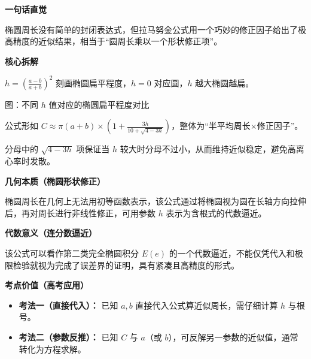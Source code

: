 \begin{explanationbox}
	\textbf{\textcolor{CExplanation}{一句话直觉}}

	椭圆周长没有简单的封闭表达式，但拉马努金公式用一个巧妙的修正因子给出了极高精度的近似结果，相当于“圆周长乘以一个形状修正项”。

	\medskip

	\textbf{\textcolor{CExplanation}{核心拆解}}

	\begin{description}[style=nextline, leftmargin=2.8em, labelsep=0.5em, itemsep=0.45em]
		\item[\textbf{要点一（h参数含义）：}]
		      $h=\left(\frac{a-b}{a+b}\right)^2$ 刻画椭圆扁平程度，$h=0$ 对应圆，$h$ 越大椭圆越扁。
		      \begin{center}
			      

			      \vspace{0.3em}
			      {\small 图：不同 $h$ 值对应的椭圆扁平程度对比}
		      \end{center}
		\item[\textbf{要点二（公式结构）：}]
		      公式形如 $C\approx \pi(a+b)\times\left(1+\frac{3h}{10+\sqrt{4-3h}}\right)$，整体为“半平均周长×修正因子”。

		\item[\textbf{要点三（根号作用）：}]
		      分母中的 $\sqrt{4-3h}$ 项保证当 $h$ 较大时分母不过小，从而维持近似稳定，避免高离心率时发散。
	\end{description}

	\medskip

	\textbf{\textcolor{CExplanation}{几何本质（椭圆形状修正）}}

	椭圆周长在几何上无法用初等函数表示，该公式通过将椭圆视为圆在长轴方向拉伸后，再对周长进行非线性修正，可用参数 $h$ 表示为含根式的代数逼近。

	\medskip

	\textbf{\textcolor{CExplanation}{代数意义（连分数逼近）}}

	该公式可以看作第二类完全椭圆积分 $E(e)$ 的一个代数逼近，不能仅凭代入和极限检验就视为完成了误差界的证明，具有紧凑且高精度的形式。

	\medskip

	\textbf{\textcolor{CExplanation}{考点价值（高考应用）}}

	\begin{itemize}[leftmargin=*, itemsep=0.5em, topsep=0.4em]
		\item \textbf{考法一（直接代入）：} 已知 $a,b$ 直接代入公式算近似周长，需仔细计算 $h$ 与根号。
		\item \textbf{考法二（参数反推）：} 已知 $C$ 与 $a$（或 $b$），可反解另一参数的近似值，通常转化为方程求解。
	\end{itemize}


\end{explanationbox}
